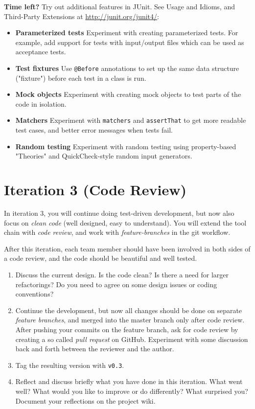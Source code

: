 \documentclass[swedish,english]{article}
\begin{document}
\textbf{Time left?} Try out additional features in JUnit. See Usage and Idioms, and Third-Party Extensions at \url{http://junit.org/junit4/}:
\begin{itemize}
\item \textbf{Parameterized tests} Experiment with creating parameterized tests. For example, add support for tests with input/output files which can be used as acceptance tests.
\item \textbf{Test fixtures} Use  \verb'@Before' annotations to set up the same data structure ("fixture") before each test in a class is run.
\item \textbf{Mock objects} Experiment with creating mock objects to test parts of the code in isolation.
\item \textbf{Matchers} Experiment with \verb'matchers' and \verb'assertThat' to get more readable test cases, and better error messages when tests fail.
\item \textbf{Random testing} Experiment with random testing using property-based "Theories" and QuickCheck-style random input generators.

\end{itemize}


\newpage


\section*{Iteration 3 (Code Review)}
In iteration 3, you will continue doing test-driven development, but now also focus on \emph{clean code} (well designed, easy to understand). You will extend the tool chain with \emph{code review}, and work with \emph{feature-branches} in the git workflow.

After this iteration, each team member should have been involved in both sides of a code review, and the code should be beautiful and well tested.

\begin{enumerate}
\item Discuss the current design. Is the code clean? Is there a need for larger refactorings? Do you need to agree on some design issues or coding conventions?
\item Continue the development, but now all changes should be done on separate \emph{feature branches}, and merged into the master branch only after code review. After pushing your commits on the feature branch, ask for code review by creating a so called \emph{pull request} on GitHub. Experiment with some discussion back and forth between the reviewer and the author.
\item Tag the resulting version with \verb'v0.3'.
\item Reflect and discuss briefly what you have done in this iteration. What went well? What would you like to improve or do differently? What surprised you? Document your reflections on the project wiki.
\end{enumerate}
\end{document}
